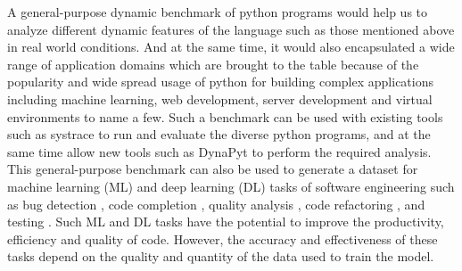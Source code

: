 A general-purpose dynamic benchmark of python programs would help us to analyze different dynamic features of the language such as those mentioned above in real world conditions. And at the same time, it would also encapsulated a wide range of application domains which are brought to the table because of the popularity and wide spread usage of python for building complex applications including machine learning, web development, server development and virtual environments to name a few.  Such a benchmark can be used with existing tools such as systrace \cite{systrace} to run and evaluate the diverse python programs, and at the same time allow new tools such as DynaPyt \cite{DynaPyt2022} to perform the required analysis. This general-purpose benchmark can also be used to generate a dataset for machine learning (ML) and deep learning (DL) tasks of software engineering such as bug detection \cite{DeepBugs2018}, code completion \cite{code_completion}, quality analysis \cite{Code_analysis_1, Code_analysis_2}, code refactoring \cite{code_refactoring}, and testing \cite{testing_1, testing_2, testing_3}. Such ML and DL tasks have the potential to improve the productivity, efficiency and quality of code. However, the accuracy and effectiveness of these tasks depend on the quality and quantity of the data used to train the model.

